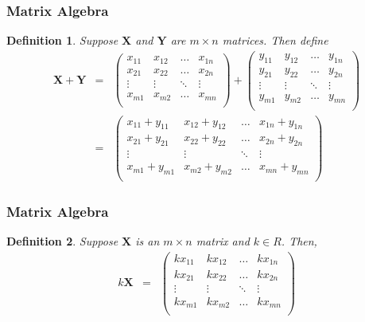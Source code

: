 \documentclass{beamer}
\newtheorem{defn}{Definition}
\numberwithin{equation}{section}
\begin{document}
\begin{frame}
\frametitle{Matrix Algebra}
\begin{defn} Suppose $\boldsymbol{X}$ and $\boldsymbol{Y} $ are $m \times n$ matrices.  Then define 
\begin{eqnarray} 
\boldsymbol{X} + \boldsymbol{Y} & = & \begin{pmatrix} 
x_{11} & x_{12} & \hdots & x_{1n} \\
x_{21} & x_{22} & \hdots & x_{2n} \\
\vdots & \vdots & \ddots & \vdots \\
x_{m1} & x_{m2} & \hdots & x_{mn} \\
\end{pmatrix} + 
\begin{pmatrix} 
y_{11} & y_{12} & \hdots & y_{1n} \\
y_{21} & y_{22} & \hdots & y_{2n} \\
\vdots & \vdots & \ddots & \vdots \\
y_{m1} & y_{m2} & \hdots & y_{mn} \\
\end{pmatrix}
\nonumber \\
& = & \begin{pmatrix} 
x_{11} + y_{11} & x_{12} + y_{12} & \hdots & x_{1n} + y_{1n} \\
x_{21} + y_{21} & x_{22} + y_{22} & \hdots & x_{2n} + y_{2n} \\
\vdots & \vdots & \ddots & \vdots\\
x_{m1} + y_{m1} & x_{m2} + y_{m2} & \hdots & x_{mn} + y_{mn} \\
\end{pmatrix} 
\nonumber 
\end{eqnarray}

\end{defn}

\end{frame}



\begin{frame}
\frametitle{Matrix Algebra} 
\begin{defn}
Suppose $\boldsymbol{X}$ is an $m \times n$ matrix and $k \in R$.  Then, 
\begin{eqnarray}
k \boldsymbol{X} & =&  \begin{pmatrix} 
k x_{11} & k x_{12} & \hdots &  k x_{1n} \\
k x_{21} & k x_{22} & \hdots & k x_{2n} \\
\vdots & \vdots & \ddots & \vdots \\
k x_{m1} & k x_{m2} & \hdots & k x_{mn} \\
\end{pmatrix}
\nonumber 
\end{eqnarray}

\end{defn}

\end{frame}
\end{document}
